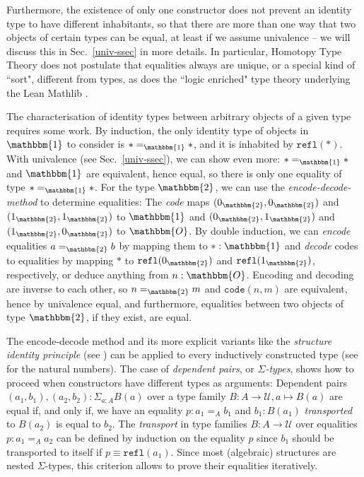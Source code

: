 \documentclass{amsart}
\theoremstyle{plain}
\numberwithin{equation}{section} %
\numberwithin{figure}{section} %
\theoremstyle{plain}
\theoremstyle{plain}
\theoremstyle{plain}
\theoremstyle{plain}
\theoremstyle{plain}
\theoremstyle{plain}
\theoremstyle{remark}
\theoremstyle{remark}
\theoremstyle{remark}
\begin{document}
Furthermore, the existence of only one constructor does not prevent an identity type to have different inhabitants, so that there are more than one way that two objects of certain types can be equal, at least if we assume univalence -- we will discuss this in Sec.~\ref{univ-ssec} in more details.
In particular, Homotopy Type Theory does not postulate that equalities always are unique, or a special kind of ``sort", different from types, as does the ``logic enriched" type theory underlying the Lean Mathlib \cite{Mathlib}.

The characterisation of identity types between arbitrary objects of a given type requires some work. By induction, the only identity type of objects in $\mathbbm{1}$ to consider is $\ast =_{\mathbbm{1}} \ast$, and it is inhabited by $\mathtt{refl}(\ast)$. With univalence (see Sec.~\ref{univ-ssec}), we can show even more: $\ast =_{\mathbbm{1}} \ast$ and $\mathbbm{1}$ are equivalent, hence equal, so there is only one equality of type $\ast =_{\mathbbm{1}} \ast$. For the type $\mathbbm{2}$, we can use the \textit{encode-decode-method} to determine equalities: The \textit{code} maps $(0_\mathbbm{2}, 0_\mathbbm{2})$ and $(1_\mathbbm{2}, 1_\mathbbm{2})$ to $\mathbbm{1}$ and $(0_\mathbbm{2}, 1_\mathbbm{2})$ and $(1_\mathbbm{2}, 0_\mathbbm{2})$ to $\mathbbm{O}$. By double induction, we can \textit{encode} equalities $a =_{\mathbbm{2}} b$ by mapping them to $\ast : \mathbbm{1}$ and \textit{decode} codes to equalities by mapping $\ast$ to $\mathtt{refl}(0_\mathbbm{2})$ and  $\mathtt{refl}(1_\mathbbm{2})$, respectively, or deduce anything from $n : \mathbbm{O}$. Encoding and decoding are inverse to each other, so $n =_{\mathbbm{2}} m$ and $\mathtt{code}(n,m)$ are equivalent, hence by univalence equal, and furthermore, equalities between two objects of type $\mathbbm{2}$, if they exist, are equal.


The encode-decode method and its more explicit variants like the \textit{structure identity principle} (see \cite[11.6]{Rij22}) can be applied to every inductively constructed type (see \cite[2.13]{HoTTBook} for the natural numbers). The case of \textit{dependent pairs}, or \textit{$\Sigma$-types}, shows how to proceed when constructors have different types as arguments: Dependent pairs $(a_1, b_1), (a_2, b_2) : \Sigma_{a : A} B(a)$ over a type family $B : A \rightarrow \mathcal{U}, a \mapsto B(a)$ are equal if, and only if, we have an equality $p : a_1 =_A b_1$ and $b_1 : B(a_1)$ \textit{transported} to $B(a_2)$ is equal to $b_2$. The \textit{transport} in type families $B : A \rightarrow \mathcal{U}$ over equalities $p : a_1 =_A a_2$ can be defined by induction on the equality $p$ since $b_1$ should be transported to itself if $p \equiv \mathtt{refl}(a_1)$. Since most (algebraic) structures are nested $\Sigma$-types, this criterion allows to prove their equalities iteratively.
\end{document}
